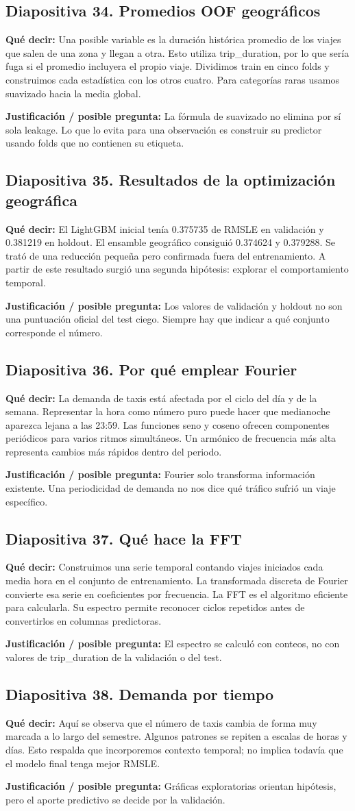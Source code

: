 \documentclass[11pt,letterpaper]{article}
\newcommand{\lamina}[2]{\subsection*{Diapositiva #1. #2}}
\newcommand{\explica}[1]{\noindent\textcolor{azul}{\textbf{Qué decir:}} #1\par\smallskip}
\newcommand{\defiende}[1]{\noindent\textcolor{verde}{\textbf{Justificación / posible pregunta:}} #1\par\medskip}
\begin{document}
\lamina{34}{Promedios OOF geográficos}
\explica{Una posible variable es la duración histórica promedio de los viajes que salen de una zona y llegan a otra. Esto utiliza trip\_duration, por lo que sería fuga si el promedio incluyera el propio viaje. Dividimos train en cinco folds y construimos cada estadística con los otros cuatro. Para categorías raras usamos suavizado hacia la media global.}
\defiende{La fórmula de suavizado no elimina por sí sola leakage. Lo que lo evita para una observación es construir su predictor usando folds que no contienen su etiqueta.}

\lamina{35}{Resultados de la optimización geográfica}
\explica{El LightGBM inicial tenía 0.375735 de RMSLE en validación y 0.381219 en holdout. El ensamble geográfico consiguió 0.374624 y 0.379288. Se trató de una reducción pequeña pero confirmada fuera del entrenamiento. A partir de este resultado surgió una segunda hipótesis: explorar el comportamiento temporal.}
\defiende{Los valores de validación y holdout no son una puntuación oficial del test ciego. Siempre hay que indicar a qué conjunto corresponde el número.}

\lamina{36}{Por qué emplear Fourier}
\explica{La demanda de taxis está afectada por el ciclo del día y de la semana. Representar la hora como número puro puede hacer que medianoche aparezca lejana a las 23:59. Las funciones seno y coseno ofrecen componentes periódicos para varios ritmos simultáneos. Un armónico de frecuencia más alta representa cambios más rápidos dentro del periodo.}
\defiende{Fourier solo transforma información existente. Una periodicidad de demanda no nos dice qué tráfico sufrió un viaje específico.}

\lamina{37}{Qué hace la FFT}
\explica{Construimos una serie temporal contando viajes iniciados cada media hora en el conjunto de entrenamiento. La transformada discreta de Fourier convierte esa serie en coeficientes por frecuencia. La FFT es el algoritmo eficiente para calcularla. Su espectro permite reconocer ciclos repetidos antes de convertirlos en columnas predictoras.}
\defiende{El espectro se calculó con conteos, no con valores de trip\_duration de la validación o del test.}

\lamina{38}{Demanda por tiempo}
\explica{Aquí se observa que el número de taxis cambia de forma muy marcada a lo largo del semestre. Algunos patrones se repiten a escalas de horas y días. Esto respalda que incorporemos contexto temporal; no implica todavía que el modelo final tenga mejor RMSLE.}
\defiende{Gráficas exploratorias orientan hipótesis, pero el aporte predictivo se decide por la validación.}
\end{document}
